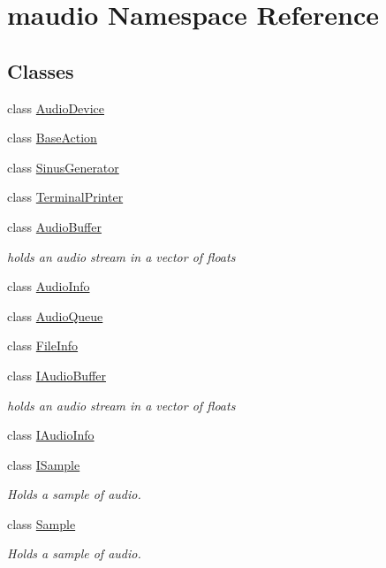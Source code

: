 \hypertarget{namespacemaudio}{\section{maudio Namespace Reference}
\label{namespacemaudio}
}
\subsection*{Classes}
\begin{DoxyCompactItemize}
\item 
class \hyperlink{classmaudio_1_1AudioDevice}{Audio\-Device}
\item 
class \hyperlink{classmaudio_1_1BaseAction}{Base\-Action}
\item 
class \hyperlink{classmaudio_1_1SinusGenerator}{Sinus\-Generator}
\item 
class \hyperlink{classmaudio_1_1TerminalPrinter}{Terminal\-Printer}
\item 
class \hyperlink{classmaudio_1_1AudioBuffer}{Audio\-Buffer}
\begin{DoxyCompactList}\small\item\em holds an audio stream in a vector of floats \end{DoxyCompactList}\item 
class \hyperlink{classmaudio_1_1AudioInfo}{Audio\-Info}
\item 
class \hyperlink{classmaudio_1_1AudioQueue}{Audio\-Queue}
\item 
class \hyperlink{classmaudio_1_1FileInfo}{File\-Info}
\item 
class \hyperlink{classmaudio_1_1IAudioBuffer}{I\-Audio\-Buffer}
\begin{DoxyCompactList}\small\item\em holds an audio stream in a vector of floats \end{DoxyCompactList}\item 
class \hyperlink{classmaudio_1_1IAudioInfo}{I\-Audio\-Info}
\item 
class \hyperlink{classmaudio_1_1ISample}{I\-Sample}
\begin{DoxyCompactList}\small\item\em Holds a sample of audio. \end{DoxyCompactList}\item 
class \hyperlink{classmaudio_1_1Sample}{Sample}
\begin{DoxyCompactList}\small\item\em Holds a sample of audio. \end{DoxyCompactList}\item 

\end{DoxyCompactItemize}

